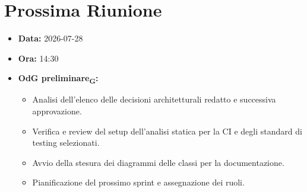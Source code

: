 \section{Prossima Riunione}
\begin{itemize}
	\item \textbf{Data:} 2026-07-28
	\item \textbf{Ora:} 14:30
	\item \textbf{OdG preliminare\textsubscript{G}:}
	\begin{itemize}
		\item Analisi dell'elenco delle decisioni architetturali redatto e successiva approvazione.
		\item Verifica e review del setup dell'analisi statica per la CI e degli standard di testing selezionati.
		\item Avvio della stesura dei diagrammi delle classi per la documentazione.
		\item Pianificazione del prossimo sprint e assegnazione dei ruoli.
	\end{itemize}
\end{itemize}